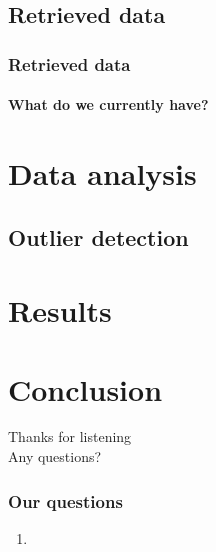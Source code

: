 \documentclass[nonav,sleutel]{beamer}
\begin{document}
\subsection{Retrieved data}
\begin{frame}
\frametitle{Retrieved data}
\framesubtitle{What do we currently have?}

\end{frame}


\section{Data analysis}
\subsection{Outlier detection}

\section{Results}

\section{Conclusion}

\begin{frame}
\begin{center}
\Large{Thanks for listening}\\
Any questions?
\end{center}

\end{frame}

\begin{frame}
\frametitle{Our questions}
\begin{enumerate}
\item 
\end{enumerate}
\end{frame}
\end{document}
